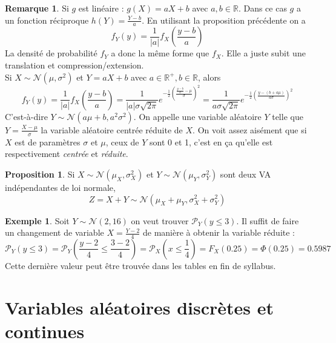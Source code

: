 \documentclass[a4paper,12pt]{report}
\theoremstyle{definition}
\newcommand{\R}{\mathbb{R}}
\renewcommand{\(}{\left(}
\renewcommand{\)}{\right)}
\renewcommand{\P}{\mathcal{P}}
\newtheorem{rmk}[thm]{Remarque}
\newtheorem{exmp}[thm]{Exemple}
\newtheorem{prop}[thm]{Proposition}
\begin{document}
            \begin{rmk}
                Si $g$ est linéaire : $g(X) = aX+b$ avec $a,b\in\R$. Dans ce cas $g$ a un fonction réciproque $h(Y) = \frac{Y-b}{a}$. En utilisant la proposition précédente on a 
                $$f_Y(y) = \frac{1}{|a|}f_X\left(\frac{y-b}{a}\right)$$
                La densité de probabilité $f_Y$ a donc la même forme que $f_X$. Elle a juste subit une translation et compression/extension.\\
                
                Si $X\sim\mathcal{N}(\mu,\sigma^2)$ et $Y = aX+b$ avec $a\in\R^+, b\in\R$, alors
                $$f_Y(y) = \frac{1}{|a|}f_X\left( \frac{y-b}{a} \right) = \frac{1}{|a|\sigma \sqrt{2\pi}}e^{-\frac{1}{2}\left( \frac{\frac{y-b}{a}-\mu}{\sigma} \right)^2} = \frac{1}{a\sigma \sqrt{2\pi}}e^{-\frac{1}{2}\left( \frac{y-(b+a\mu)}{a\sigma} \right)^2}$$
                C'est-à-dire $Y\sim\mathcal{N}(a\mu+b,a^2\sigma^2)$. On appelle une variable aléatoire $Y$ telle que $Y = \frac{X-\mu}{\sigma}$ la variable aléatoire centrée réduite de $X$. On voit assez aisément que si $X$ est de paramètres $\sigma$ et $\mu$, ceux de $Y$ sont 0 et 1, c'est en ça qu'elle est respectivement \textit{centrée} et \textit{réduite}.
            \end{rmk}
            
            \begin{leftbar}
            \begin{prop}
            Si $X\sim\mathcal{N}(\mu_X,\sigma_X^2)$ et $Y\sim\mathcal{N}(\mu_Y,\sigma_Y^2)$ sont deux VA indépendantes de loi normale,
            $$Z = X + Y \sim \mathcal{N}\left( \mu_X+\mu_Y,\sigma_X^2+\sigma_Y^2 \right)$$
            \end{prop}
            \end{leftbar}
            
            \begin{exmp}
                Soit $Y\sim\mathcal{N}(2,16)$ on veut trouver $\P_Y(y\leq 3)$. Il suffit de faire un changement de variable $X = \frac{Y-2}{4}$ de manière à obtenir la variable réduite :
                $$\P_Y(y\leq 3) = \P_Y\left( \frac{y-2}{4}\leq \frac{3-2}{4}\right)  = \P_X\left( x\leq \frac{1}{4} \right) = F_X(0.25) = \Phi(0.25) = 0.5987$$
                Cette dernière valeur peut être trouvée dans les tables en fin de syllabus.
            \end{exmp}
            
    \section{Variables aléatoires discrètes et continues}
\end{document}
